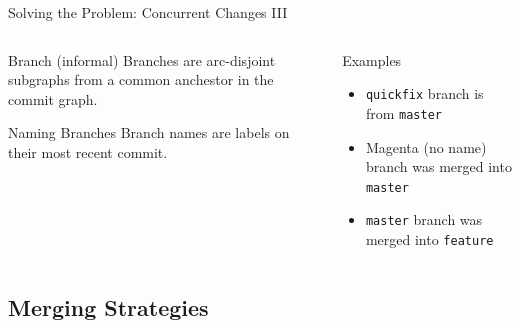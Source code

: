 \documentclass[xetex, handout]{beamer}
\begin{document}
\begin{frame}[fragile]{Solving the Problem: Concurrent Changes III}
  \begin{columns}[t]
    \begin{column}{.5\linewidth}
      \begin{block}{Branch (informal)}
        Branches are arc-disjoint subgraphs from a common anchestor in the
        commit graph.
      \end{block}
      \begin{alertblock}{Naming Branches}
        Branch names are labels on their most recent commit.
      \end{alertblock}
    \end{column}
    \begin{column}{.5\linewidth}
      \begin{exampleblock}{Examples}
        \begin{itemize}
          \item \texttt{quickfix} branch is from \texttt{master}
          \item Magenta (no name) branch was merged into \texttt{master}
          \item \texttt{master} branch was merged into \texttt{feature}
        \end{itemize}
      \end{exampleblock}
    \end{column}
  \end{columns}
\end{frame}

\subsection{Merging Strategies}
\end{document}
